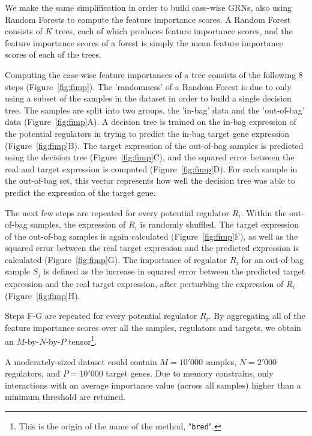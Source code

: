 We make the same simplification in order to build case-wise GRNs, also using Random Forests to compute the feature importance scores. A Random Forest consists of $K$ trees, each of which produces feature importance scores, and the feature importance scores of a forest is simply the mean feature importance scores of each of the trees. 

Computing the case-wise feature importances of a tree consists of the following 8 steps (Figure~\ref{fig:fimp}).
The 'randomness' of a Random Forest is due to only using a subset of the samples in the dataset in order to build a single decision tree. The samples are split into two groups, the 'in-bag' data and the 'out-of-bag' data (Figure~\ref{fig:fimp}A). A decision tree \cite{breiman_classificationregressiontrees_1984} is trained on the in-bag expression of the potential regulators in trying to predict the in-bag target gene expression (Figure~\ref{fig:fimp}B). The target expression of the out-of-bag samples is predicted using the decision tree (Figure~\ref{fig:fimp}C), and the squared error between the real and target expression is computed (Figure~\ref{fig:fimp}D). For each sample in the out-of-bag set, this vector represents how well the decision tree was able to predict the expression of the target gene.

The next few steps are repeated for every potential regulator $R_i$. Within the out-of-bag samples, the expression of $R_i$ is randomly shuffled. The target expression of the out-of-bag samples is again calculated (Figure~\ref{fig:fimp}F), as well as the squared error between the real target expression and the predicted expression is calculated (Figure~\ref{fig:fimp}G). The importance of regulator $R_i$ for an out-of-bag sample $S_j$ is defined as the increase in squared error between the predicted target expression and the real target expression, after perturbing the expression of $R_i$ (Figure~\ref{fig:fimp}H). 

Steps F-G are repeated for every potential regulator $R_i$. By aggregating all of the feature importance scores over all the samples, regulators and targets, we obtain an $M$-by-$N$-by-$P$ tensor\footnote{This is the origin of the name of the method, "\texttt{bred}".}. 

A moderately-sized dataset could contain $M=10'000$ samples, $N=2'000$ regulators, and $P=10'000$ target genes. Due to memory constrains, only interactions with an average importance value (across all samples) higher than a minimum threshold are retained.

